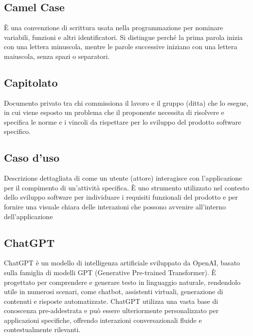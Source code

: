 \newpage




\section{}

\hypertarget{sec:Camel Case}{}
\subsection*{Camel Case}
È una convenzione di scrittura usata nella programmazione per nominare variabili, funzioni e altri identificatori. 
Si distingue perché la prima parola inizia con una lettera minuscola, mentre le parole successive iniziano con una lettera maiuscola, senza spazi o separatori.

\hypertarget{sec:capitolato}{}
\subsection*{Capitolato}
Documento privato tra chi commissiona il lavoro e il gruppo (ditta) che lo esegue, in cui viene esposto un problema che il proponente necessita di risolvere 
e specifica le norme e i vincoli da rispettare per lo sviluppo del prodotto software specifico.

\hypertarget{sec:caso_uso}{}
\subsection*{Caso d'uso}
Descrizione dettagliata di come un utente (attore) interagisce con l'applicazione per il compimento di un'attività specifica. È uno strumento utilizzato nel 
contesto dello sviluppo software per individuare i requisiti funzionali del prodotto e per fornire una visuale chiara delle interazioni che possono avvenire 
all'interno dell'applicazione

\hypertarget{sec:chatgpt}{}
\subsection*{ChatGPT}
ChatGPT è un modello di intelligenza artificiale sviluppato da OpenAI, basato sulla famiglia di modelli GPT (Generative Pre-trained Transformer). 
È progettato per comprendere e generare testo in linguaggio naturale, rendendolo utile in numerosi scenari, come chatbot, assistenti virtuali, generazione 
di contenuti e risposte automatizzate. ChatGPT utilizza una vasta base di conoscenza pre-addestrata e può essere ulteriormente personalizzato per 
applicazioni specifiche, offrendo interazioni conversazionali fluide e contestualmente rilevanti.

